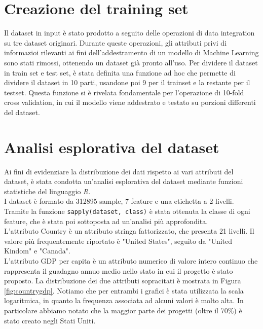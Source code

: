 \section{Creazione del training set}
Il dataset in input è stato prodotto a seguito delle operazioni di data integration su tre dataset originari. Durante queste operazioni, gli attributi privi di informazioi rilevanti ai fini dell'addestramento di un modello di Machine Learning sono stati rimossi, ottenendo un dataset già pronto all'uso. Per dividere il dataset in train set e test set, è stata definita una funzione ad hoc che permette di dividere il dataset in 10 parti, usandone poi 9 per il trainset e la restante per il testset. Questa funzione si è rivelata fondamentale per l'operazione di 10-fold cross validation, in cui il modello viene addestrato e testato su porzioni differenti del dataset.

\section{Analisi esplorativa del dataset}
Ai fini di evidenziare la distribuzione dei dati rispetto ai vari attributi del dataset, è stata condotta un'analisi esplorativa del dataset mediante funzioni statistiche del linguaggio \emph{R}.\\
I dataset è formato da 312895 sample, 7 feature e una etichetta a 2 livelli.
Tramite la funzione \texttt{sapply(dataset, class)} è stata ottenuta la classe di ogni feature, che è stata poi sottoposta ad un'analisi più approfondita.\\
L'attributo Country è un attributo stringa fattorizzato, che presenta 21 livelli. Il valore più frequentemente riportato è "United States", seguito da "United Kindom" e "Canada".\\
L'attributo GDP per capita è un attributo numerico di valore intero continuo che rappresenta il guadagno annuo medio nello stato in cui il progetto è stato proposto. La distribuzione dei due attributi sopracitati è mostrata in Figura \ref{fig:countrygdp}. Notiamo che per entrambi i grafici è stata utilizzata la scala logaritmica, in quanto la frequenza associata ad alcuni valori è molto alta. In particolare abbiamo notato che la maggior parte dei progetti (oltre il 70\%) è stato creato negli Stati Uniti.

